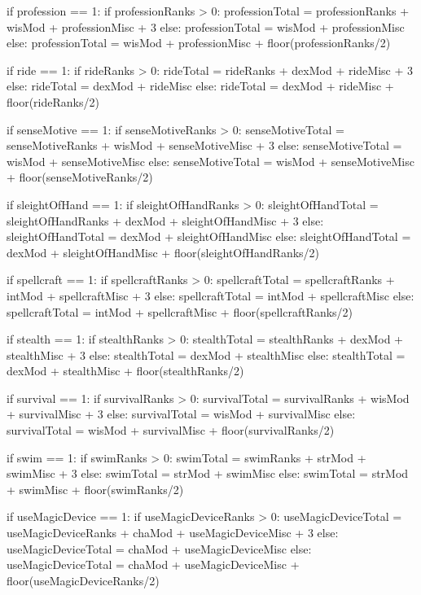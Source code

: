 \begin{python}
if profession == 1:
	 if professionRanks > 0:
	  professionTotal = professionRanks + wisMod + professionMisc + 3
	 else:
	  professionTotal = wisMod + professionMisc
else:
	 professionTotal = wisMod + professionMisc + floor(professionRanks/2)

if ride == 1:
	 if rideRanks > 0:
	  rideTotal = rideRanks + dexMod + rideMisc + 3
	 else:
	  rideTotal = dexMod + rideMisc
else:
	 rideTotal = dexMod + rideMisc + floor(rideRanks/2)

if senseMotive == 1:
	 if senseMotiveRanks > 0:
	  senseMotiveTotal = senseMotiveRanks + wisMod + senseMotiveMisc + 3
	 else:
	  senseMotiveTotal = wisMod + senseMotiveMisc
else:
	 senseMotiveTotal = wisMod + senseMotiveMisc + floor(senseMotiveRanks/2)

if sleightOfHand == 1:
	 if sleightOfHandRanks > 0:
	  sleightOfHandTotal = sleightOfHandRanks + dexMod + sleightOfHandMisc + 3
	 else:
	  sleightOfHandTotal = dexMod + sleightOfHandMisc
else:
	 sleightOfHandTotal = dexMod + sleightOfHandMisc + floor(sleightOfHandRanks/2)

if spellcraft == 1:
	 if spellcraftRanks > 0:
	  spellcraftTotal = spellcraftRanks + intMod + spellcraftMisc + 3
	 else:
	  spellcraftTotal = intMod + spellcraftMisc
else:
	 spellcraftTotal = intMod + spellcraftMisc + floor(spellcraftRanks/2)

if stealth == 1:
	 if stealthRanks > 0:
	  stealthTotal = stealthRanks + dexMod + stealthMisc + 3
	 else:
	  stealthTotal = dexMod + stealthMisc
else:
	 stealthTotal = dexMod + stealthMisc + floor(stealthRanks/2)

if survival == 1:
	 if survivalRanks > 0:
	  survivalTotal = survivalRanks + wisMod + survivalMisc + 3
	 else:
	  survivalTotal = wisMod + survivalMisc
else:
	 survivalTotal = wisMod + survivalMisc + floor(survivalRanks/2)

if swim == 1:
	 if swimRanks > 0:
	  swimTotal = swimRanks + strMod + swimMisc + 3
	 else:
	  swimTotal = strMod + swimMisc
else:
	 swimTotal = strMod + swimMisc + floor(swimRanks/2)

if useMagicDevice == 1:
	 if useMagicDeviceRanks > 0:
	  useMagicDeviceTotal = useMagicDeviceRanks + chaMod + useMagicDeviceMisc + 3
	 else:
	  useMagicDeviceTotal = chaMod + useMagicDeviceMisc
else:
	 useMagicDeviceTotal = chaMod + useMagicDeviceMisc + floor(useMagicDeviceRanks/2)




\end{python}
